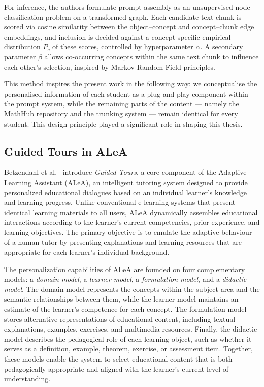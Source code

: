 For inference, the authors formulate prompt assembly as an unsupervised node classification problem on a transformed graph. Each candidate text chunk is scored via cosine similarity between the object–concept and concept–chunk edge embeddings, and inclusion is decided against a concept-specific empirical distribution $P_c$ of these scores, controlled by hyperparameter $\alpha$. A secondary parameter $\beta$ allows co-occurring concepts within the same text chunk to influence each other's selection, inspired by Markov Random Field principles.

This method inspires the present work in the following way: we conceptualise the personalised information of each student as a plug-and-play component within the prompt system, while the remaining parts of the content — namely the MathHub repository and the trunking system — remain identical for every student. This design principle played a significant role in shaping this thesis.



\subsection{Guided Tours in ALeA}

Betzendahl et al.~\cite{10.1007/978-3-031-50485-3_39} introduce \emph{Guided Tours}, a core component of the Adaptive Learning Assistant (ALeA), an intelligent tutoring system designed to provide personalized educational dialogues based on an individual learner's knowledge and learning progress. Unlike conventional e-learning systems that present identical learning materials to all users, ALeA dynamically assembles educational interactions according to the learner's current competencies, prior experience, and learning objectives. The primary objective is to emulate the adaptive behaviour of a human tutor by presenting explanations and learning resources that are appropriate for each learner's individual background.

The personalization capabilities of ALeA are founded on four complementary models: a \emph{domain model}, a \emph{learner model}, a \emph{formulation model}, and a \emph{didactic model}. The domain model represents the concepts within the subject area and the semantic relationships between them, while the learner model maintains an estimate of the learner's competence for each concept. The formulation model stores alternative representations of educational content, including textual explanations, examples, exercises, and multimedia resources. Finally, the didactic model describes the pedagogical role of each learning object, such as whether it serves as a definition, example, theorem, exercise, or assessment item. Together, these models enable the system to select educational content that is both pedagogically appropriate and aligned with the learner's current level of understanding.

